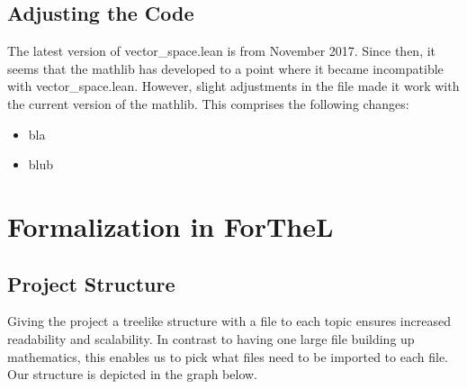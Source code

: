 \documentclass[11pt]{article}
\begin{document}
\subsection{Adjusting the Code}
The latest version of vector\_space.lean is from November 2017. Since then, it seems that the mathlib has developed to a point where it became incompatible with vector\_space.lean.
However, slight adjustments in the file made it work with the current version of the mathlib. This comprises the following changes:
\begin{itemize}
\item bla
\item blub
\end{itemize}



\newpage
\lstset{style=ftl}
\section{Formalization in ForTheL}
\subsection{Project Structure}
Giving the project a treelike structure with a file to each topic ensures increased readability and scalability. 
In contrast to having one large file building up mathematics, this enables us to pick what files need to be imported to each file. 
Our structure is depicted in the graph below.

\begin{figure}[h]
\begin{center}
\end{center}
\end{figure}
\end{document}
